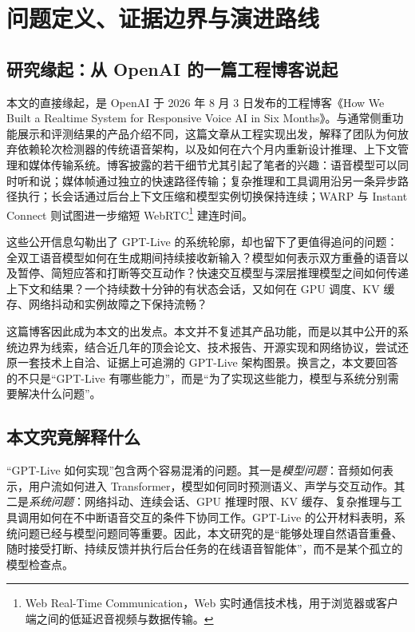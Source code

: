 \documentclass[UTF8,fontset=none,a4paper,10pt]{ctexart}
\begin{document}
\clearpage
\begingroup
\small
\setlength{\parskip}{0pt}
\linespread{1.02}\selectfont
\setcounter{tocdepth}{2}
\tableofcontents
\endgroup
\clearpage

\section{问题定义、证据边界与演进路线}

\subsection{研究缘起：从 OpenAI 的一篇工程博客说起}

本文的直接缘起，是 OpenAI 于 2026 年 8 月 3 日发布的工程博客《How We Built a Realtime System for Responsive Voice AI in Six Months》\cite{openai2026continuous}。与通常侧重功能展示和评测结果的产品介绍不同，这篇文章从工程实现出发，解释了团队为何放弃依赖轮次检测器的传统语音架构，以及如何在六个月内重新设计推理、上下文管理和媒体传输系统。博客披露的若干细节尤其引起了笔者的兴趣：语音模型可以同时听和说；媒体帧通过独立的快速路径传输；复杂推理和工具调用沿另一条异步路径执行；长会话通过后台上下文压缩和模型实例切换保持连续；WARP 与 Instant Connect 则试图进一步缩短 WebRTC\footnote{Web Real-Time Communication，Web 实时通信技术栈，用于浏览器或客户端之间的低延迟音视频与数据传输。} 建连时间。

这些公开信息勾勒出了 GPT-Live 的系统轮廓，却也留下了更值得追问的问题：全双工语音模型如何在生成期间持续接收新输入？模型如何表示双方重叠的语音以及暂停、简短应答和打断等交互动作？快速交互模型与深层推理模型之间如何传递上下文和结果？一个持续数十分钟的有状态会话，又如何在 GPU 调度、KV 缓存、网络抖动和实例故障之下保持流畅？

这篇博客因此成为本文的出发点。本文并不复述其产品功能，而是以其中公开的系统边界为线索，结合近几年的顶会论文、技术报告、开源实现和网络协议，尝试还原一套技术上自洽、证据上可追溯的 GPT-Live 架构图景。换言之，本文要回答的不只是“GPT-Live 有哪些能力”，而是“为了实现这些能力，模型与系统分别需要解决什么问题”。

\subsection{本文究竟解释什么}

“GPT-Live 如何实现”包含两个容易混淆的问题。其一是\emph{模型问题}：音频如何表示，用户流如何进入 Transformer，模型如何同时预测语义、声学与交互动作。其二是\emph{系统问题}：网络抖动、连续会话、GPU 推理时限、KV 缓存、复杂推理与工具调用如何在不中断语音交互的条件下协同工作。GPT-Live 的公开材料表明，系统问题已经与模型问题同等重要\cite{openai2026gptlive,openai2026continuous}。因此，本文研究的是“能够处理自然语音重叠、随时接受打断、持续反馈并执行后台任务的在线语音智能体”，而不是某个孤立的模型检查点。
\end{document}
